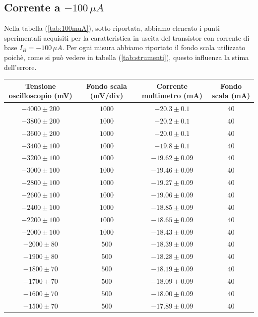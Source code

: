 \documentclass[]{article}
\begin{document}
\subsection{Corrente a $ -100\,\mu A $}
Nella tabella (\ref{tab:100muA}), sotto riportata, abbiamo elencato i punti sperimentali acquisiti per la caratteristica in uscita del transistor con corrente di base $ I_{B}= -100\,\mu A $. Per ogni misura abbiamo riportato il fondo scala utilizzato poichè, come si può vedere in tabella (\ref{tab:strumenti}), questo influenza la stima dell'errore.
	\begin{table}[H]
		\centering
	\begin{tabular}{|c|c|c|c|}
		\hline
		Tensione oscilloscopio (mV)& Fondo scala (mV/div) & Corrente multimetro (mA) &Fondo scala (mA)\\
		\hline
		$ -4000\pm 200 $ &$ 1000 $ & $ -20.3\pm 0.1 $ &40\\
		\hline
		$-3800\pm200 $ &$ 1000 $ & $ -20.2\pm0.1 $ &40 \\
		\hline
		$ -3600\pm 200 $ &$ 1000 $ & $ -20.0\pm 0.1 $ &40 \\
		\hline
		$ -3400\pm 100 $ &$ 1000 $ & $ -19.8\pm 0.1 $ &40 \\
		\hline
		$ -3200\pm 100 $ &$ 1000 $ & $-19.62\pm 0.09$ &40 \\
		\hline
		$ -3000\pm 100 $ &$ 1000 $ & $ -19.46\pm 0.09 $ &40 \\
		\hline
		$ -2800\pm 100 $ &$ 1000 $ & $ -19.27\pm 0.09 $ &40 \\
		\hline
		$ -2600\pm 100 $ &$ 1000 $ & $ -19.06\pm 0.09 $ &40 \\
		\hline
		$ -2400\pm 100 $ &$ 1000 $ & $ -18.85\pm 0.09 $ &40 \\
		\hline
		$ -2200\pm 100 $ &$ 1000 $ & $ -18.65\pm 0.09 $ &40 \\
		\hline
		$ -2000\pm 100 $ &$ 1000 $ & $ -18.43\pm0.09 $  &40\\
		\hline
		$ -2000\pm 80 $ &$ 500 $ & $ -18.39\pm0.09 $  &40\\
		\hline
		$ -1900\pm 80 $ &$ 500 $ & $ -18.28\pm0.09 $  &40\\
		\hline
		$ -1800\pm 70 $ &$ 500 $ & $ -18.19\pm 0.09 $ &40 \\
		\hline
		$ -1700\pm 70 $ &$ 500 $ & $ -18.09\pm 0.09 $ &40 \\
		\hline
		$ -1600\pm 70 $ &$ 500 $ & $ -18.00\pm 0.09 $ &40 \\
		\hline
		$ -1500\pm 70 $ &$ 500 $ & $ -17.89\pm 0.09 $ &40 \\

\end{tabular}
\end{table}
\end{document}
